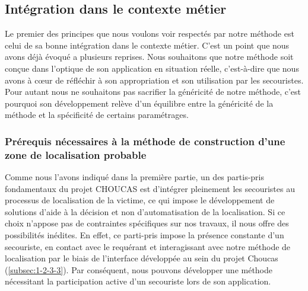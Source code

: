 
\subsection{Intégration dans le contexte métier}

Le premier des principes que nous voulons voir respectés par notre
méthode est celui de sa bonne intégration dans le contexte métier.
%
C'est un point que nous avons déjà évoqué a plusieurs reprises. Nous
souhaitons que notre méthode soit conçue dans l'optique de son
application en situation réelle, c'est-à-dire que nous avons à cœur de
réfléchir à son appropriation et son utilisation par les
secouristes. Pour autant nous ne souhaitons pas sacrifier la
généricité de notre méthode, c'est pourquoi son développement relève
d'un équilibre entre la généricité de la méthode et la spécificité de
certains paramétrages.

\subsubsection{Prérequis nécessaires à la méthode de construction
  d'une zone de localisation probable}
\label{sec:4-1-1-1}

Comme nous l'avons indiqué dans la première partie, un des partis-pris
fondamentaux du projet CHOUCAS est d'intégrer pleinement les
secouristes au processus de localisation de la victime, ce qui impose
le développement de solutions d'aide à la décision et non
d'automatisation de la localisation. Si ce choix n'appose pas de
contraintes spécifiques sur nos travaux, il nous offre des
possibilités inédites. En effet, ce parti-pris impose la présence
constante d'un secouriste, en contact avec le requérant et
interagissant avec notre méthode de localisation par le biais de
l'interface développée au sein du projet Choucas
(\ref{subsec:1-2-3-3}). Par conséquent, nous pouvons développer une
méthode nécessitant la participation active d'un secouriste lors de
son application.

